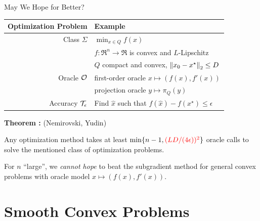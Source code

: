 \documentclass[9pt]{beamer}
\begin{document}
\begin{frame}{May We Hope for Better?}


  \begin{center}
    \begin{tabular}{r|l}
      \hline
      Optimization Problem & Example \\[0.5em]
      \hline
      Class $\Sigma$ & $\min_{x\in  Q} f(x)$ \\[0.5em]
                           & $f:\Re^n\to\Re$ is convex and $L$-Lipschitz\\[0.5em]
                           & $Q$ compact and convex, $\left\|x_0-x^\star\right\|_2\leq D$ \\[0.5em]
      Oracle $\mathcal O$ & first-order oracle $x\mapsto (f(x), f'(x))$\\[0.5em]
      & projection oracle $y\mapsto \pi_Q(y)$\\[0.5em]
      Accuracy $\mathcal T_\epsilon$ & Find $\hat x$ such that $f(\hat x)-f(x^\star)\leq\epsilon$\\[0.5em]
      \hline
    \end{tabular}
  \end{center}

  \vfill

  
  \textbf{Theorem :} (Nemirovski, Yudin)

  Any optimization method takes at least $\min \{n-1, {\color{red} (LD / (4\epsilon))^2}\}$ oracle calls to solve the mentioned class of optimization problems.

  \vfill

  For $n$ ``large'', we \emph{cannot hope} to beat the subgradient method for general convex problems with oracle model $x \mapsto (f(x), f'(x))$.
  
\end{frame}

\section{Smooth Convex Problems}
\end{document}
